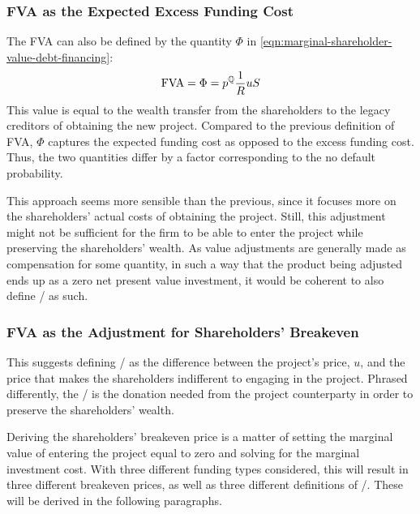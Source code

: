 \documentclass[main.tex]{subfiles}
\begin{document}
        \subsubsection*{FVA as the Expected Excess Funding Cost}
            The FVA can also be defined by the quantity $\Phi$ in 
            \cref{eqn:marginal-shareholder-value-debt-financing}:
                \begin{equation}
                    \FVA/
                    =
                        \Phi
                    =
                        p^{\rnmeasure}
                        \discountfactor
                        u
                        S
                    \label{eqn:fva-as-expected-excess-funding-cost}
                \end{equation}
            This value is equal to the wealth transfer from the shareholders to the legacy creditors
            of obtaining the new project.
            Compared to the previous definition of FVA, 
            $\Phi$ captures the expected funding cost as opposed to the excess funding cost.
            Thus, the two quantities differ by a factor corresponding to the no default probability.

            This approach seems more sensible than the previous, 
            since it focuses more on the shareholders' actual costs of obtaining the project.
            Still, this adjustment might not be sufficient
            for the firm to be able to enter the project while preserving the shareholders' wealth.
            As value adjustments are generally made as compensation for some quantity,
            in such a way that the product being adjusted ends up as a zero net present value investment,
            it would be coherent to also define \FVA/ as such.
            
        \subsubsection*{FVA as the Adjustment for Shareholders' Breakeven}
            This suggests defining \FVA/ as the difference between the project's price, $u$,
            and the price that makes the shareholders indifferent to engaging in the project.
            Phrased differently, the \FVA/ is the donation needed from the project counterparty 
            in order to preserve the shareholders' wealth.

            Deriving the shareholders' breakeven price
            is a matter of setting the marginal value of entering the project equal to zero
            and solving for the marginal investment cost. 
            With three different funding types considered, this will result in three different breakeven prices,
            as well as three different definitions of \FVA/.
            These will be derived in the following paragraphs.
            
\end{document}
